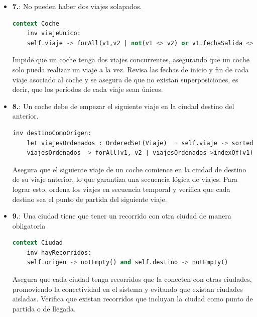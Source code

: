 \documentclass[12pt.a4paper]{article}
\begin{document}
\begin{itemize}
    \item \textbf{7.}: No pueden haber dos viajes solapados.
    \begin{lstlisting}[style = useEspecifico,language=SQL]
  context Coche
    inv viajeUnico:
    self.viaje -> forAll(v1,v2 | not(v1 <> v2) or v1.fechaSalida <> v2.fechaSalida and (v1.fechaLlegada <= v2.fechaSalida or v2.fechaLlegada <= v1.fechaSalida))
    \end{lstlisting}
    Impide que un coche tenga dos viajes concurrentes, asegurando que un coche solo pueda realizar un viaje a la vez.
    Revisa las fechas de inicio y fin de cada viaje asociado al coche y se asegura de que no existan superposiciones, es decir, que los períodos de cada viaje sean únicos.
    
    \item \textbf{8.}: Un coche debe de empezar el siguiente viaje en la ciudad destino del anterior.
    \begin{lstlisting}[style = useEspecifico,language=SQL]
    inv destinoComoOrigen:
    let viajesOrdenados : OrderedSet(Viaje)  = self.viaje -> sortedBy(v | v.fechaSalida) in 
    viajesOrdenados -> forAll(v1, v2 | viajesOrdenados->indexOf(v1) = viajesOrdenados->indexOf(v2) + 1 implies v1.recorrido.destino = v2.recorrido.origen)
    \end{lstlisting}
    Asegura que el siguiente viaje de un coche comience en la ciudad de destino de su viaje anterior, lo que garantiza una secuencia lógica de viajes.
    Para lograr esto, ordena los viajes en secuencia temporal y verifica que cada destino sea el punto de partida del siguiente viaje.
    
    \item \textbf{9.}: Una ciudad tiene que tener un recorrido con otra ciudad de manera obligatoria
    \begin{lstlisting}[style = useEspecifico,language=SQL]
  context Ciudad
    inv hayRecorridos:
    self.origen -> notEmpty() and self.destino -> notEmpty()
    \end{lstlisting}
    Asegura que cada ciudad tenga recorridos que la conecten con otras ciudades, promoviendo la conectividad en el sistema y evitando que existan ciudades aisladas.
    Verifica que existan recorridos que incluyan la ciudad como punto de partida o de llegada.
    

\end{itemize}
\end{document}
